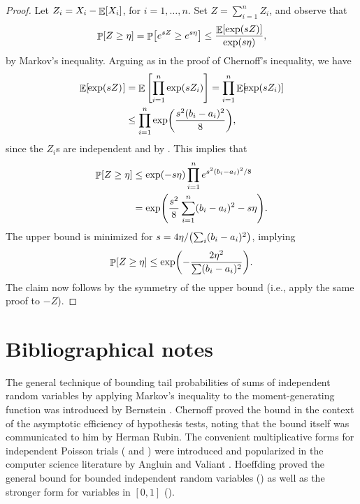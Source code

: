 \begin{proof}
    Let $Z_{i}=X_{i}-\mathop{\mathbb{E}}\!\left[ {X_{i}} \right]$, for $i=1,\ldots, n$.  Set
    $Z = \sum_{i=1}^{n}Z_{i}$, and observe that
    \begin{align*}
        \Prob{ Z \geq \eta \MakesBig }  %
        =%
        \Prob{e^{sZ} \geq e^{s \eta}}
        \leq  \frac{\Ex{\exp\pth{sZ}}}{\exp(s\eta)},
    \end{align*}
    by Markov's inequality. Arguing as in the proof of Chernoff's
    inequality, we have
    \begin{align*}
    \Ex{\MakeSBig\! \ts \exp\pth{sZ}\ts }
    &= \Ex[]{ \prod_{i=1}^{n} \exp\pth{sZ_i}}%
    =%
    \prod_{i=1}^{n} \Ex{ \MakesBig\! \exp\pth{sZ_i}} \\
    &\leq
    \prod_{i=1}^{n} \exp \pth{ \frac{s^{2}(b_{i}-a_{i})^{2}}{8}},
    \end{align*}
    since the $Z_i$s are independent and by
    . This implies that
    \begin{align*}
        \Prob{ Z \geq \eta \MakesBig } %
        &\leq%
        \exp(-s\eta) \prod_{i=1}^{n} e^{s^{2}(b_{i}-a_{i})^{2}/8} \\
        &=%
        \exp\pth{ \frac{s^{2}}{8}\sum_{i=1}^{n}(b_{i}-a_{i})^{2} -
           s\eta }.
    \end{align*}
    The upper bound is minimized for $s = 4\eta/\pth{\sum_i
       (b_{i}-a_{i})^{2}}$, implying
    \[
    \Prob{ Z \geq \eta \MakesBig }%
    \leq%
    \exp \pth{-\frac{2\eta^{2}}{\sum (b_{i}-a_{i})^{2}}}.
    \]
    The claim now follows by the symmetry of the upper bound (i.e.,
    apply the same proof to $-Z$).
\end{proof}








\section{Bibliographical notes}

The general technique of bounding tail probabilities of sums of
independent random variables by applying Markov's inequality to the
moment-generating function was introduced by Bernstein \cite{b-mcief-24}.
Chernoff \cite{c-maetbso-52} proved the bound in the context of the
asymptotic efficiency of hypothesis tests, noting that the bound itself
was communicated to him by Herman Rubin.  The convenient multiplicative
forms for independent Poisson trials ( and
) were introduced and popularized in the
computer science literature by Angluin and Valiant \cite{av-fpahm-79}.
Hoeffding \cite{h-pissbrv-63} proved the general bound for bounded
independent random variables () as well as
the stronger form for variables in $[0,1]$ ().

